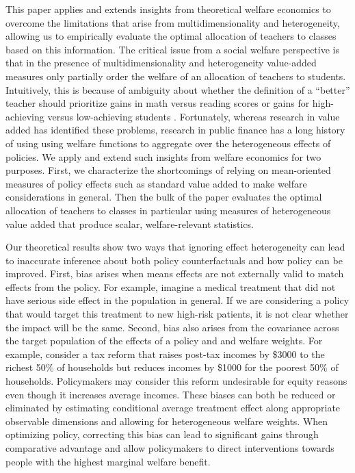 \documentclass[12pt]{article}
\theoremstyle{definition}
\theoremstyle{definition}
\theoremstyle{definition}
\theoremstyle{definition}
\begin{document}
This paper applies and extends insights from theoretical welfare economics to overcome the limitations that arise from multidimensionality and heterogeneity, allowing us to empirically evaluate the optimal allocation of teachers to classes based on this information.  The critical issue from a social welfare perspective is that in the presence of multidimensionality and heterogeneity value-added measures only partially order the welfare of an allocation of teachers to students.  Intuitively, this is because of ambiguity about whether the definition of a ``better'' teacher should prioritize gains in math versus reading scores or gains for high-achieving versus low-achieving students  \citep[see impossibility-like results in][]{condie2014teacher}. Fortunately, whereas research in value added has identified these problems, research in public finance has a long history of using using welfare functions to aggregate over the heterogeneous effects of policies. We apply and extend such insights from welfare economics for two purposes. First, we  characterize the shortcomings of relying on mean-oriented measures of policy effects such as standard value added to make welfare considerations in general. Then the bulk of the paper evaluates the optimal allocation of teachers to classes in particular using measures of heterogeneous value added that produce scalar, welfare-relevant statistics.

Our theoretical results show two ways that ignoring effect heterogeneity can lead to inaccurate inference about both policy counterfactuals and how policy can be improved. First, bias arises when means effects are not externally valid to match effects from the policy. For example, imagine a medical treatment that did not have serious side effect in the population in general. If we are considering a policy that would target this treatment to new high-risk patients, it is not clear whether the impact will be the same. Second, bias also arises from the covariance across the target population of the effects of a policy and and welfare weights. For example, consider a tax reform that raises post-tax incomes by \$3000 to the richest 50\% of households but reduces incomes by \$1000 for the poorest 50\% of households. Policymakers may consider this reform undesirable for equity reasons even though it increases average incomes. These biases can both be reduced or eliminated by estimating conditional average treatment effect along appropriate observable dimensions and allowing for heterogeneous welfare weights. When optimizing policy, correcting this bias can lead to significant gains through comparative advantage and allow policymakers to direct interventions towards people with the highest marginal welfare benefit. 
 
\end{document}
